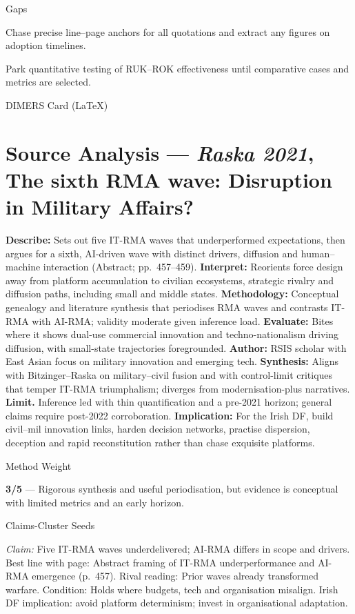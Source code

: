 Gaps

Chase precise line–page anchors for all quotations and extract any figures on adoption timelines.

Park quantitative testing of RUK–ROK effectiveness until comparative cases and metrics are selected.

\parencite{RASKA_2021}

DIMERS Card (LaTeX)

\section*{Source Analysis — \textit{Raska 2021}, The sixth RMA wave: Disruption in Military Affairs?}
\textbf{Describe:} Sets out five IT-RMA waves that underperformed expectations, then argues for a sixth, AI-driven wave with distinct drivers, diffusion and human–machine interaction (Abstract; pp.~457–459).
\textbf{Interpret:} Reorients force design away from platform accumulation to civilian ecosystems, strategic rivalry and diffusion paths, including small and middle states.
\textbf{Methodology:} Conceptual genealogy and literature synthesis that periodises RMA waves and contrasts IT-RMA with AI-RMA; validity moderate given inference load.
\textbf{Evaluate:} Bites where it shows dual-use commercial innovation and techno-nationalism driving diffusion, with small-state trajectories foregrounded.
\textbf{Author:} RSIS scholar with East Asian focus on military innovation and emerging tech.
\textbf{Synthesis:} Aligns with Bitzinger–Raska on military–civil fusion and with control-limit critiques that temper IT-RMA triumphalism; diverges from modernisation-plus narratives.
\textbf{Limit.} Inference led with thin quantification and a pre-2021 horizon; general claims require post-2022 corroboration.
\textbf{Implication:} For the Irish DF, build civil–mil innovation links, harden decision networks, practise dispersion, deception and rapid reconstitution rather than chase exquisite platforms.

Method Weight

\textbf{3/5} — Rigorous synthesis and useful periodisation, but evidence is conceptual with limited metrics and an early horizon.

Claims-Cluster Seeds

\textit{Claim:} Five IT-RMA waves underdelivered; AI-RMA differs in scope and drivers.
Best line with page: Abstract framing of IT-RMA underperformance and AI-RMA emergence (p.~457).
Rival reading: Prior waves already transformed warfare.
Condition: Holds where budgets, tech and organisation misalign.
Irish DF implication: avoid platform determinism; invest in organisational adaptation.


